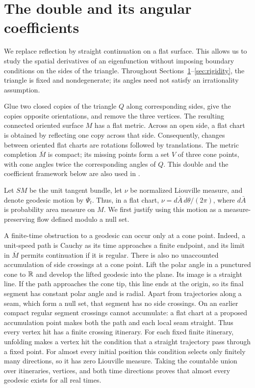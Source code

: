 \section{The double and its angular coefficients}\label{sec:geometry}

We replace reflection by straight continuation on a flat surface. This
allows us to study the spatial derivatives of an eigenfunction without
imposing boundary conditions on the sides of the triangle. Throughout
Sections~\ref{sec:geometry}--\ref{sec:rigidity}, the triangle is fixed and
nondegenerate; its angles need not satisfy an irrationality assumption.

Glue two closed copies of the triangle \(Q\) along corresponding sides,
give the copies opposite orientations, and remove the three vertices.
The resulting connected oriented surface \(M\) has a flat metric. Across
an open side, a flat chart is obtained by reflecting one copy across
that side. Consequently, changes between oriented flat charts are
rotations followed by translations. The metric completion \(\overline M\)
is compact; its missing points form a set \(V\) of three cone points,
with cone angles twice the corresponding angles of \(Q\). This double
and the coefficient framework below are also used in
\cite[Section~2]{Companion}.

Let \(SM\) be the unit tangent bundle, let \(\nu\) be normalized
Liouville measure, and denote geodesic motion by \(\Psi_t\). Thus, in
a flat chart, \(\nu=d\bar A\,d\theta/(2\pi)\), where \(d\bar A\)
is probability area measure on \(M\). We first justify using this
motion as a measure-preserving flow defined modulo a null set.

A finite-time obstruction to a geodesic can occur only at a cone point.
Indeed, a unit-speed path is Cauchy as its time approaches a finite
endpoint, and its limit in \(\overline M\) permits continuation if it
is regular. There is also no unaccounted accumulation of side crossings
at a cone point. Lift the polar angle in a punctured cone to \(\mathbb R\)
and develop the lifted geodesic into the plane. Its image is a straight
line. If the path approaches the cone tip, this line ends at the
origin, so its final segment has constant polar angle and is radial.
Apart from trajectories along a seam, which
form a null set, that segment has no side crossings. On an earlier
compact regular segment crossings cannot accumulate: a flat chart at
a proposed accumulation point makes both the path and each local seam
straight. Thus every vertex hit has a finite crossing itinerary.
For each fixed finite itinerary, unfolding makes a vertex hit the
condition that a straight trajectory pass through a fixed point. For
almost every initial position this condition selects only finitely
many directions, so it has zero Liouville measure. Taking the countable
union over itineraries, vertices, and both time directions proves that
almost every geodesic exists for all real times.

